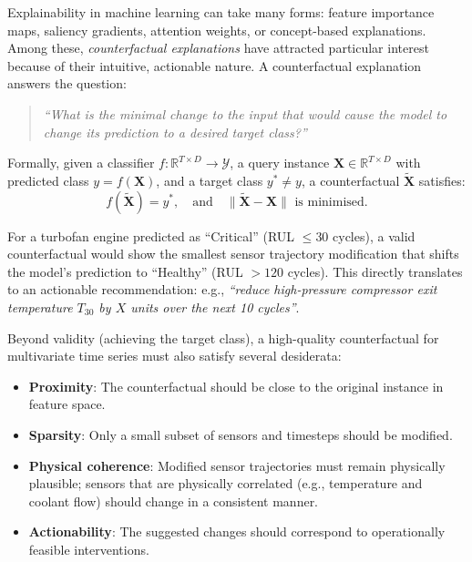 Explainability in machine learning can take many forms: feature importance maps, saliency gradients, attention weights, or concept-based explanations. Among these, \emph{counterfactual explanations} have attracted particular interest because of their intuitive, actionable nature. A counterfactual explanation answers the question:

\begin{quote}
\textit{``What is the minimal change to the input that would cause the model to change its prediction to a desired target class?''}
\end{quote}

Formally, given a classifier $f: \mathbb{R}^{T \times D} \rightarrow \mathcal{Y}$, a query instance $\mathbf{X} \in \mathbb{R}^{T \times D}$ with predicted class $y = f(\mathbf{X})$, and a target class $y^* \neq y$, a counterfactual $\widetilde{\mathbf{X}}$ satisfies:
\begin{equation}
    f(\widetilde{\mathbf{X}}) = y^*, \quad \text{and} \quad \|\widetilde{\mathbf{X}} - \mathbf{X}\| \text{ is minimised.}
\end{equation}

For a turbofan engine predicted as ``Critical'' (RUL $\leq 30$ cycles), a valid counterfactual would show the smallest sensor trajectory modification that shifts the model's prediction to ``Healthy'' (RUL $> 120$ cycles). This directly translates to an actionable recommendation: e.g., \textit{``reduce high-pressure compressor exit temperature $T_{30}$ by $X$ units over the next 10 cycles''}.

Beyond validity (achieving the target class), a high-quality counterfactual for multivariate time series must also satisfy several desiderata:
\begin{itemize}
    \item \textbf{Proximity}: The counterfactual should be close to the original instance in feature space.
    \item \textbf{Sparsity}: Only a small subset of sensors and timesteps should be modified.
    \item \textbf{Physical coherence}: Modified sensor trajectories must remain physically plausible; sensors that are physically correlated (e.g., temperature and coolant flow) should change in a consistent manner.
    \item \textbf{Actionability}: The suggested changes should correspond to operationally feasible interventions.
\end{itemize}

